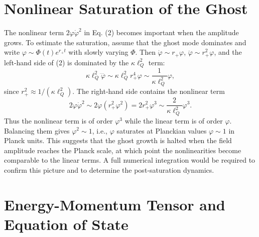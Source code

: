 \documentclass[11pt,a4paper]{article}
\begin{document}
\section{Nonlinear Saturation of the Ghost}
\label{sec:nonlinear}

The nonlinear term \(2\varphi\dot\varphi^2\) in Eq. (2) becomes important when the amplitude grows. To estimate the saturation, assume that the ghost mode dominates and write \(\varphi \sim \Phi(t) e^{r_+ t}\) with slowly varying \(\Phi\). Then \(\dot\varphi \sim r_+ \varphi\), \(\ddot\varphi \sim r_+^2 \varphi\), and the left‑hand side of (2) is dominated by the \(\kappa\ell_Q^2\) term:
\begin{equation}
\kappa\ell_Q^2 \ddddot\varphi \sim \kappa\ell_Q^2 r_+^4 \varphi \sim \frac{1}{\kappa\ell_Q^2} \varphi,
\end{equation}
since \(r_+^2 \approx 1/(\kappa\ell_Q^2)\). The right‑hand side contains the nonlinear term
\begin{equation}
2\varphi\dot\varphi^2 \sim 2\varphi (r_+^2 \varphi^2) = 2 r_+^2 \varphi^3 \sim \frac{2}{\kappa\ell_Q^2} \varphi^3.
\end{equation}
Thus the nonlinear term is of order \(\varphi^3\) while the linear term is of order \(\varphi\). Balancing them gives \(\varphi^2 \sim 1\), i.e., \(\varphi\) saturates at Planckian values \(\varphi \sim 1\) in Planck units. This suggests that the ghost growth is halted when the field amplitude reaches the Planck scale, at which point the nonlinearities become comparable to the linear terms. A full numerical integration would be required to confirm this picture and to determine the post‑saturation dynamics.

\section{Energy-Momentum Tensor and Equation of State}
\label{sec:energy}
\end{document}

